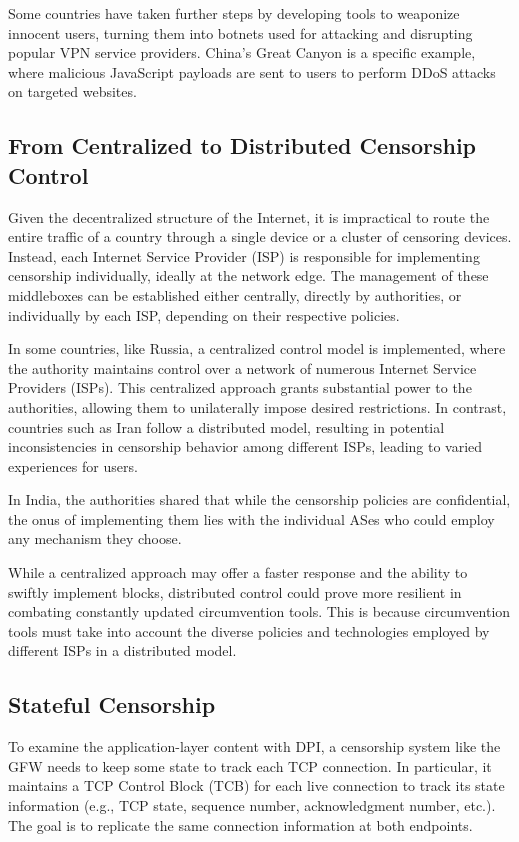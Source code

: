 Some countries have taken further steps by developing tools to weaponize innocent users, turning them into botnets used for attacking and disrupting popular VPN service providers. China's Great Canyon is a specific example, where malicious JavaScript payloads are sent to users to perform DDoS attacks on targeted websites.\cite{marczak2015great}

\subsection{From Centralized to Distributed Censorship Control}
Given the decentralized structure of the Internet, it is impractical to route the entire traffic of a country through a single device or a cluster of censoring devices. Instead, each Internet Service Provider (ISP) is responsible for implementing censorship individually, ideally at the network edge. The management of these middleboxes can be established either centrally, directly by authorities, or individually by each ISP, depending on their respective policies.

In some countries, like Russia, a centralized control model is implemented, where the authority maintains control over a network of numerous Internet Service Providers (ISPs). This centralized approach grants substantial power to the authorities, allowing them to unilaterally impose desired restrictions. In contrast, countries such as Iran follow a distributed model, resulting in potential inconsistencies in censorship behavior among different ISPs, leading to varied experiences for users.\cite{xue2021throttling}

In India, the authorities shared that while the censorship policies are confidential, the onus of implementing them lies with the individual ASes who could employ any mechanism they choose.\cite{yadav2018light}

While a centralized approach may offer a faster response and the ability to swiftly implement blocks, distributed control could prove more resilient in combating constantly updated circumvention tools. This is because circumvention tools must take into account the diverse policies and technologies employed by different ISPs in a distributed model.

\subsection{Stateful Censorship}
To examine the application-layer content with DPI, a censorship system like the GFW needs to keep some state to track each TCP connection. In particular, it maintains a TCP Control Block (TCB) for each live connection to track its state information (e.g., TCP state, sequence number, acknowledgment number, etc.). The goal is to replicate the same connection information at both endpoints. \cite{wang2017state}


